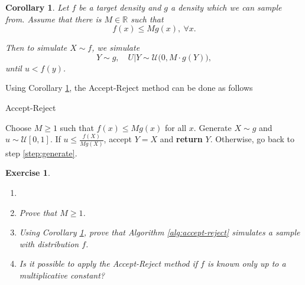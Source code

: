 \documentclass{article}\usepackage[]{graphicx}\usepackage[]{xcolor}
\newtheorem{exercise}{Exercise}
\newtheorem{corollary}{Corollary}
\begin{document}
\begin{corollary}\label{Accept-reject theo corr}
Let $f$ be a target density and $g$ a density which we can sample from. Assume that there is $M\in \mathbb{R}$ such that 
\begin{equation*}
f(x) \leq M g(x), ~\forall x.
\end{equation*}

Then to simulate $X \sim f$, we simulate 
\begin{equation*}
Y \sim g,\quad U|Y \sim \mathcal{U}\big(0,M\cdot g(Y)\big),
\end{equation*}
until $ u < f(y)$.
\end{corollary}

Using Corollary \ref{Accept-reject theo corr}, the Accept-Reject method can be done as follows

\begin{algorithm}[H]
\caption{Accept-Reject}
\label{alg:accept-reject}
\begin{algorithmic}[1]
\State Choose \( M \geq 1 \) such that \( f(x) \leq M g(x) \) for all \( x \).
\State \label{step:generate} Generate \( X \sim g \) and \( u \sim \mathcal{U}[0,1] \).
\State If \( u \leq \frac{f(X)}{M g(X)} \), accept \( Y = X \) and \textbf{return} \( Y \).
\State Otherwise, go back to step \ref{step:generate}.
\end{algorithmic}
\end{algorithm}

\begin{exercise}
\begin{enumerate}
\item[] 
\item Prove that $M\geq 1$.
\item Using Corollary \ref{Accept-reject theo corr}, prove that Algorithm \ref{alg:accept-reject} simulates a sample with distribution $f$.
\item Is it possible to apply the Accept-Reject method if $f$ is known only up to a multiplicative constant?
\end{enumerate}
\end{exercise}
\end{document}
